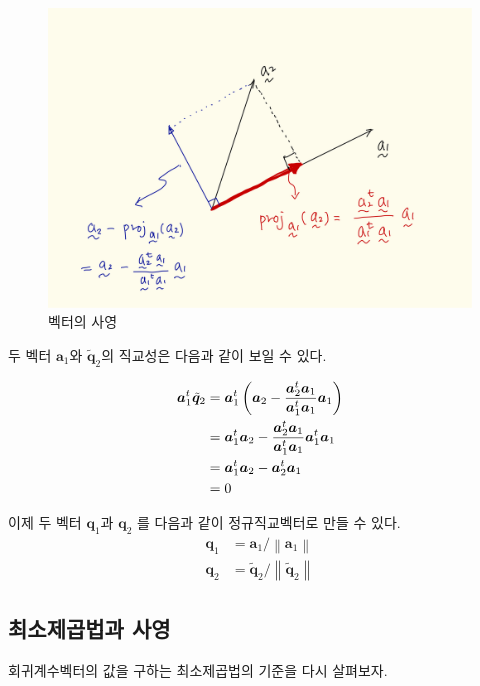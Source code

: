 \documentclass[
]{book}
\newcommand{\norm}[1]{\left\lVert#1\right\rVert}
\theoremstyle{definition}
\theoremstyle{definition}
\theoremstyle{definition}
\theoremstyle{definition}
\theoremstyle{remark}
\begin{document}
\begin{figure}
\centering
\includegraphics{proj1.png}
\caption{벡터의 사영}
\end{figure}

두 벡터 \(\bm a_1\)와 \(\tilde {\bm q}_2\)의 직교성은 다음과 같이 보일 수 있다.

\begin{align}
\bm a_1^t  \tilde {\bm q}_2 & =
 \bm a_1^t  \left ( \bm a_2 -  \frac{ \bm a_2^t \bm a_1} {\bm a_1^t \bm a_1} \bm a_1 \right ) \notag \\
 & = \bm a_1^t \bm a_2 - \frac{ \bm a_2^t \bm a_1} {\bm a_1^t \bm a_1}  \bm a_1^t \bm a_1 \notag \\
 & = \bm a_1^t \bm a_2 - \bm a_2^t \bm a_1 \notag \\
 & = 0 
 \label{eq:proofortho}
\end{align}

이제 두 벡터 \(\bm q_1\)과 \(\bm q_2\) 를 다음과 같이 정규직교벡터로 만들 수 있다.
\begin{align*}
\bm q_1 & =  \bm a_1 / \norm{\bm a_1 } \\
\bm q_2 & =  \tilde {\bm q}_2 / \norm{\tilde {\bm q}_2}
\end{align*}

\hypertarget{uxcd5cuxc18cuxc81cuxacf1uxbc95uxacfc-uxc0acuxc601}{%
\subsection{최소제곱법과 사영}\label{uxcd5cuxc18cuxc81cuxacf1uxbc95uxacfc-uxc0acuxc601}}

회귀계수벡터의 값을 구하는 최소제곱법의 기준을 다시 살펴보자.
\end{document}
